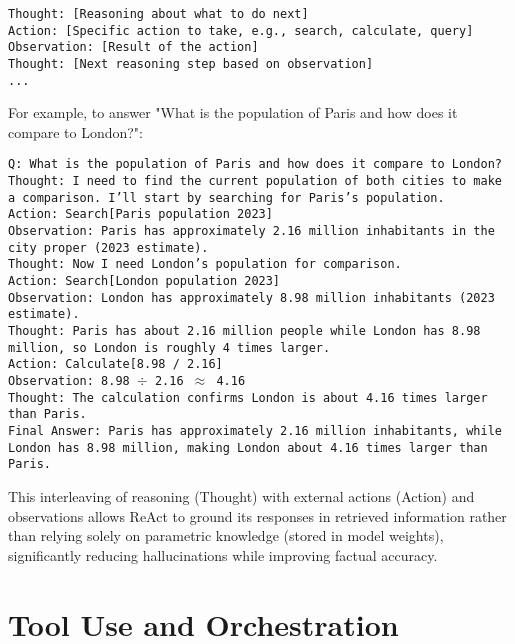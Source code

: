 \texttt{Thought: [Reasoning about what to do next]}\\
\texttt{Action: [Specific action to take, e.g., search, calculate, query]}\\
\texttt{Observation: [Result of the action]}\\
\texttt{Thought: [Next reasoning step based on observation]}\\
\texttt{...}

For example, to answer "What is the population of Paris and how does it compare to London?":

\texttt{Q: What is the population of Paris and how does it compare to London?}\\
\texttt{Thought: I need to find the current population of both cities to make a comparison. I'll start by searching for Paris's population.}\\
\texttt{Action: Search[Paris population 2023]}\\
\texttt{Observation: Paris has approximately 2.16 million inhabitants in the city proper (2023 estimate).}\\
\texttt{Thought: Now I need London's population for comparison.}\\
\texttt{Action: Search[London population 2023]}\\
\texttt{Observation: London has approximately 8.98 million inhabitants (2023 estimate).}\\
\texttt{Thought: Paris has about 2.16 million people while London has 8.98 million, so London is roughly 4 times larger.}\\
\texttt{Action: Calculate[8.98 / 2.16]}\\
\texttt{Observation: 8.98 $\div$ 2.16 $\approx$ 4.16}\\
\texttt{Thought: The calculation confirms London is about 4.16 times larger than Paris.}\\
\texttt{Final Answer: Paris has approximately 2.16 million inhabitants, while London has 8.98 million, making London about 4.16 times larger than Paris.}

This interleaving of reasoning (Thought) with external actions (Action) and observations allows ReAct to ground its responses in retrieved information rather than relying solely on parametric knowledge (stored in model weights), significantly reducing hallucinations while improving factual accuracy.
\section{Tool Use and Orchestration}

